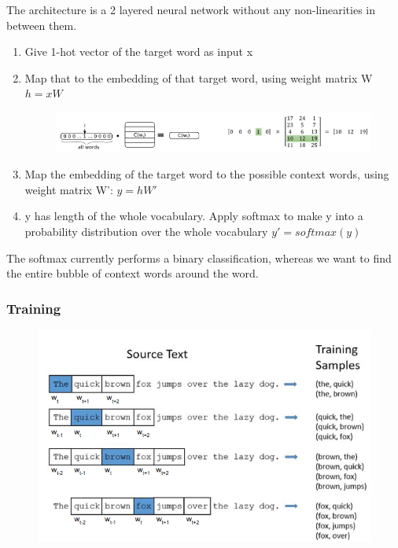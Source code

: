 \documentclass[11pt]{article}
\begin{document}
The architecture is a 2 layered neural network without any non-linearities in between them. 

\begin{enumerate}
    \item Give 1-hot vector of the target word as input x
    \item Map that to the embedding of that target word, using weight matrix W $h=xW$
    
    \begin{figure}
        \centering
        \includegraphics*[width=\linewidth]{figures/one-hot-word-embedding-extraction.png}
    \end{figure}

    \item Map the embedding of the target word to the possible context words, using weight matrix W': $y=hW'$
    \item y has length of the whole vocabulary. Apply softmax to make y into a probability distribution over the whole vocabulary $y'=softmax(y)$
\end{enumerate}

The softmax currently performs a binary classification, whereas we want to find the entire bubble of context words around the word.

\subsubsection{Training}

\begin{figure}[H]
    \centering
    \includegraphics[trim={0 0 0 5px}, clip, width=.8\linewidth]{figures/training-skip-gram.png}
\end{figure}
\end{document}
